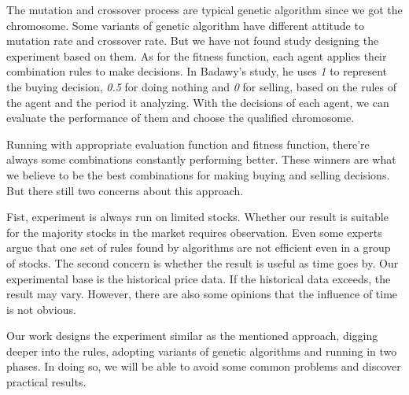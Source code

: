 \documentclass{article}
\begin{document}
The mutation and crossover process are typical genetic algorithm since we got the chromosome.
Some variants of genetic algorithm have different attitude to mutation rate and crossover rate.
But we have not found study designing the experiment based on them.
As for the fitness function, each agent applies their combination rules to make decisions.
In Badawy's study, he uses \emph{1} to represent the buying decision, \emph{0.5} for doing nothing and \emph{0} for selling,
based on the rules of the agent and the period it analyzing. \cite{genetic-algorithms-for-predicting-the-egyptian-stock-market}
With the decisions of each agent, we can evaluate the performance of them and choose the qualified chromosome.

Running with appropriate evaluation function and fitness function,
there're always some combinations constantly performing better.
These winners are what we believe to be the best combinations for making buying and selling decisions.
But there still two concerns about this approach.

Fist, experiment is always run on limited stocks.
Whether our result is suitable for the majority stocks in the market requires observation.
Even some experts argue that one set of rules found by algorithms are not efficient even in a group of stocks. \cite{stock-timing-using-genetic-algorithms}
The second concern is whether the result is useful as time goes by.
Our experimental base is the historical price data.
If the historical data exceeds, the result may vary.
However, there are also some opinions that the influence of time is not obvious. \cite{stock-timing-using-genetic-algorithms}

Our work designs the experiment similar as the mentioned approach,
digging deeper into the rules, adopting variants of genetic algorithms and running in two phases.
In doing so, we will be able to avoid some common problems and discover practical results.






\end{document}
